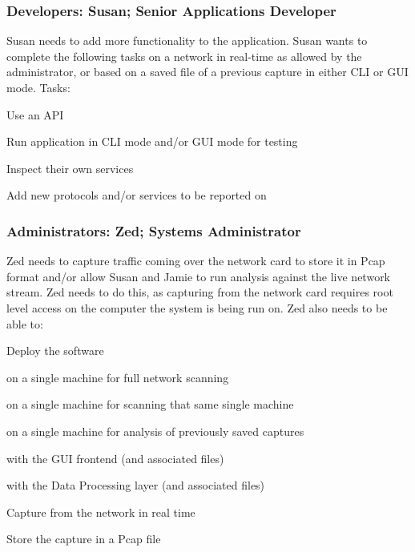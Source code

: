 \documentclass[titlepage]{article}
\begin{document}

\subsubsection{Developers: Susan; Senior Applications Developer%
  \label{susan}%
}

Susan needs to add more functionality to the application.  Susan wants to
complete the following tasks on a network in real-time as allowed by the administrator,
or based on a saved file of a previous capture in either CLI or GUI mode.
%
Tasks:
\begin{itemize*}
    \item Use an API
    \item Run application in CLI mode and/or GUI mode for testing
    \item Inspect their own services
    \item Add new protocols and/or services to be reported on
\end{itemize*}


\subsubsection{Administrators: Zed; Systems Administrator%
  \label{zed}%
}

Zed needs to capture traffic coming over the network card to store it in Pcap
format and/or allow Susan and Jamie to run analysis against the live network
stream.  Zed needs to do this, as capturing from the network card requires root
level access on the computer the system is being run on.  
%
Zed also needs to be able to:
\begin{itemize*}
    \item Deploy the software
    \begin{itemize*}
        \item on a single machine for full network scanning
        \item on a single machine for scanning that same single machine
        \item on a single machine for analysis of previously saved captures
        \item with the GUI frontend (and associated files)
        \item with the Data Processing layer (and associated files)
    \end{itemize*}
    \item Capture from the network in real time
    \item Store the capture in a Pcap file
\end{itemize*}
\end{document}
